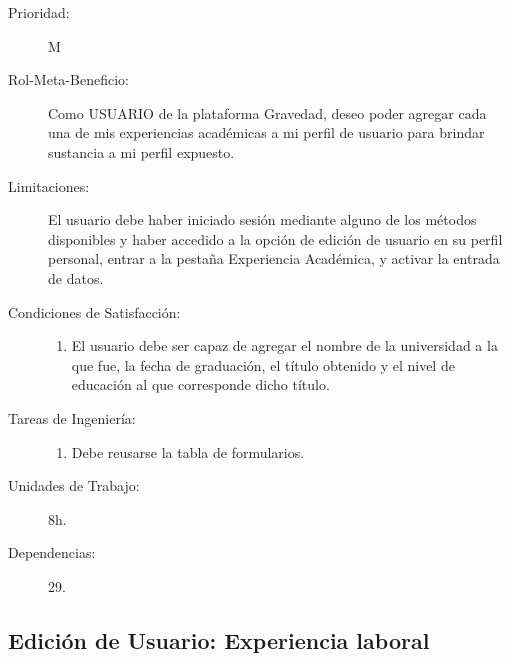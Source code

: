 \begin{description}
    \item[Prioridad:] M
    \item[Rol-Meta-Beneficio:] Como USUARIO de la plataforma Gravedad, deseo poder agregar cada una de mis experiencias académicas a mi perfil de usuario para brindar sustancia a mi perfil expuesto.
    \item[Limitaciones:] El usuario debe haber iniciado sesión mediante alguno de los métodos disponibles y haber accedido a la opción de edición de usuario en su perfil personal, entrar a la pestaña Experiencia Académica, y activar la entrada de datos.
    \item[Condiciones de Satisfacción:]  \hfill
        \begin{enumerate}
            \item El usuario debe ser capaz de agregar el nombre de la universidad a la que fue, la fecha de graduación, el título obtenido y el nivel de educación al que corresponde dicho título.
        \end{enumerate}
    \item[Tareas de Ingeniería:]  \hfill
        \begin{enumerate}
            \item Debe reusarse la tabla de formularios.
        \end{enumerate}
    \item[Unidades de Trabajo:] 8h.
    \item[Dependencias:] 29.
\end{description}

\newpage


\subsection{Edición de Usuario: Experiencia laboral}

